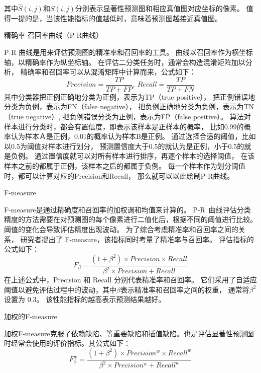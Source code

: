 %
%
其中$\hat{S}(i,j)$和$S(i,j)$分别表示显著性预测图和相应真值图对应坐标的像素。
值得一提的是，当该性能指标的值越低时，意味着预测图越接近真值图。\par
%
%
%
精确率-召回率曲线（P-R曲线）\par
%
%
P-R 曲线是用来评估预测图的精准率和召回率的工具。
曲线以召回率作为横坐标轴，以精确率作为纵坐标轴。
在评估二分类任务时，通常会构造混淆矩阵加以分析，
精确率和召回率可以从混淆矩阵中计算而来，公式如下：
%
%
\begin{equation}
	Precision = \frac{TP}{TP + FP},~Recall = \frac{TP}{TP+FN}
\end{equation}
%
%
其中分类器把正例正确地分类为正例，表示为TP（true positive），
把正例错误地分类为负例，表示为FN（false negative），
把负例正确地分类为负例，表示为TN（true negative）,
把负例错误分类为正例，表示为FP（false positive）。
算法对样本进行分类时，都会有置信度，即表示该样本是正样本的概率，
比如0.99的概率认为样本Ａ是正例，0.01的概率认为样本B是正例。
通过选择合适的阈值，比如以0.5为阈值对样本进行划分，
预测置信度大于0.5的就认为是正例，小于0.5的就是负例。
通过置信度就可以对所有样本进行排序，再逐个样本的选择阈值，
在该样本之前的都属于正例，该样本之后的都属于负例。
每一个样本作为划分阈值时，都可以计算对应的Precision和Recall，
那么就可以以此绘制P-R曲线。\par
%
%
%
%
F-measure\par
%
%
F-measure是通过精确度和召回率的加权调和均值来计算的。
P-R~曲线评估分类精度的方法需要在对预测图的每个像素进行二值化后，根据不同的阈值进行比较。
阈值的变化会导致评估精度出现波动。
为了综合考虑精准率和召回率之间的关系，
研究者提出了 F-measure，该指标同时考量了精准率与召回率。
评估指标的公式如下：
%
%
\begin{equation}
	F_{\beta} = \frac{\left ( 1 + \beta^{2} \right ) \times Precision \times Recall }{\beta^{2} \times Precision + Recall } 
\end{equation}
%
%
在上述公式中，Precision 和 Recall 分别代表精准率和召回率。
它们采用了自适应阈值以避免评估过程中的波动，其中$\beta$表示精准率和召回率之间的权重，
通常将$\beta^{2}$设置为 0.3。
该性能指标的越高表示预测结果越好。\par
%
%
加权的F-measure\par
%
%
加权F-measure克服了依赖缺陷、等重要缺陷和插值缺陷\cite{margolin2014evaluate}。也是评估显著性预测图时经常会使用的评价指标。其公式如下：
\begin{equation}
	F_{\beta}^{w} = \frac{\left ( 1 + \beta^{2} \right ) \times Precision^{w}  \times Recall^{w} }{\beta^{2} \times Precision^{w} + Recall^{w} } 
\end{equation}
